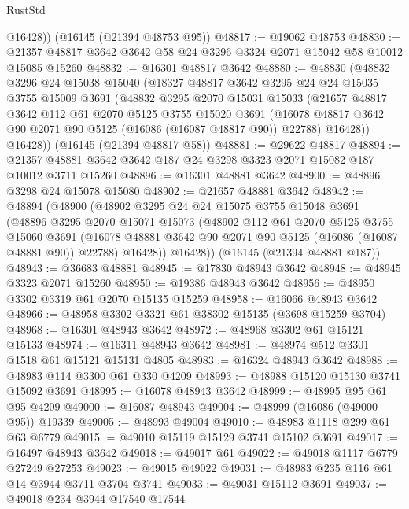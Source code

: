 \begin{lexlean}{RustStd}
\begin{coremodule}
        @16428))
    (@16145 (@21394 @48753 @95))
@48817 := @19062 @48753
@48830 := @21357 @48817 @3642 @3642 @58 @24 @3296 @3324 @2071 @15042 @58 @10012 @15085 @15260
@48832 := @16301 @48817 @3642
@48880 := @48830
    (@48832
      @3296
      @24
      @15038
      @15040
      (@18327
        @48817
        @3642
        @3295
        @24
        @24
        @15035
        @3755
        @15009
        @3691
        (@48832
          @3295
          @2070
          @15031
          @15033
          (@21657
            @48817
            @3642
            @112
            @61
            @2070
            @5125
            @3755
            @15020
            @3691
            (@16078 @48817 @3642 @90 @2071 @90 @5125 (@16086 (@16087 @48817 @90)) @22788)
            @16428))
        @16428))
    (@16145 (@21394 @48817 @58))
@48881 := @29622 @48817
@48894 := @21357 @48881 @3642 @3642 @187 @24 @3298 @3323 @2071 @15082 @187 @10012 @3711 @15260
@48896 := @16301 @48881 @3642
@48900 := @48896 @3298 @24 @15078 @15080
@48902 := @21657 @48881 @3642
@48942 := @48894
    (@48900
      (@48902
        @3295
        @24
        @24
        @15075
        @3755
        @15048
        @3691
        (@48896
          @3295
          @2070
          @15071
          @15073
          (@48902
            @112
            @61
            @2070
            @5125
            @3755
            @15060
            @3691
            (@16078 @48881 @3642 @90 @2071 @90 @5125 (@16086 (@16087 @48881 @90)) @22788)
            @16428))
        @16428))
    (@16145 (@21394 @48881 @187))
@48943 := @36683 @48881
@48945 := @17830 @48943 @3642
@48948 := @48945 @3323 @2071 @15260
@48950 := @19386 @48943 @3642
@48956 := @48950 @3302 @3319 @61 @2070 @15135 @15259
@48958 := @16066 @48943 @3642
@48966 := @48958 @3302 @3321 @61 @38302 @15135 (@3698 @15259 @3704)
@48968 := @16301 @48943 @3642
@48972 := @48968 @3302 @61 @15121 @15133
@48974 := @16311 @48943 @3642
@48981 := @48974 @512 @3301 @1518 @61 @15121 @15131 @4805
@48983 := @16324 @48943 @3642
@48988 := @48983 @114 @3300 @61 @330 @4209
@48993 := @48988 @15120 @15130 @3741 @15092 @3691
@48995 := @16078 @48943 @3642
@48999 := @48995 @95 @61 @95 @4209
@49000 := @16087 @48943
@49004 := @48999 (@16086 (@49000 @95)) @19339
@49005 := @48993 @49004
@49010 := @48983 @1118 @299 @61 @63 @6779
@49015 := @49010 @15119 @15129 @3741 @15102 @3691
@49017 := @16497 @48943 @3642
@49018 := @49017 @61
@49022 := @49018 @1117 @6779 @27249 @27253
@49023 := @49015 @49022
@49031 := @48983 @235 @116 @61 @14 @3944 @3711 @3704 @3741
@49033 := @49031 @15112 @3691
@49037 := @49018 @234 @3944 @17540 @17544

\end{coremodule}
\end{lexlean}
